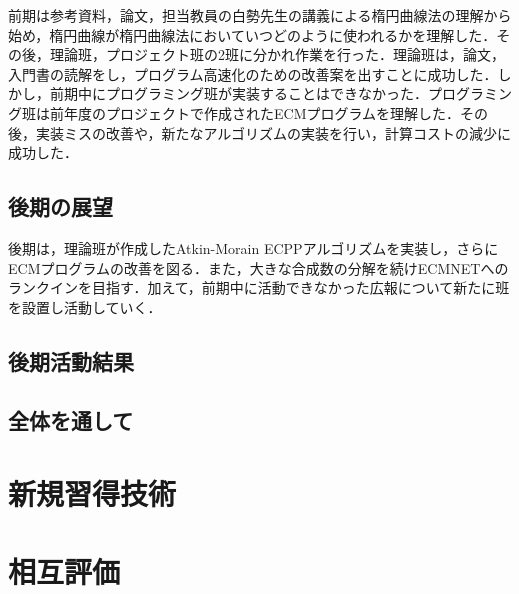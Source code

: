 \documentclass[openany,11pt,papersize]{jsbook}
\begin{document}
前期は参考資料，論文，担当教員の白勢先生の講義による楕円曲線法の理解から始め，楕円曲線が楕円曲線法においていつどのように使われるかを理解した．その後，理論班，プロジェクト班の2班に分かれ作業を行った．理論班は，論文，入門書の読解をし，プログラム高速化のための改善案を出すことに成功した．しかし，前期中にプログラミング班が実装することはできなかった．プログラミング班は前年度のプロジェクトで作成されたECMプログラムを理解した．その後，実装ミスの改善や，新たなアルゴリズムの実装を行い，計算コストの減少に成功した．


\section{後期の展望}

後期は，理論班が作成したAtkin-Morain ECPPアルゴリズムを実装し，さらにECMプログラムの改善を図る．また，大きな合成数の分解を続けECMNETへのランクインを目指す．加えて，前期中に活動できなかった広報について新たに班を設置し活動していく．


\section{後期活動結果}


\section{全体を通して}


\appendix
\chapter{新規習得技術}


\chapter{相互評価}




\end{document}
